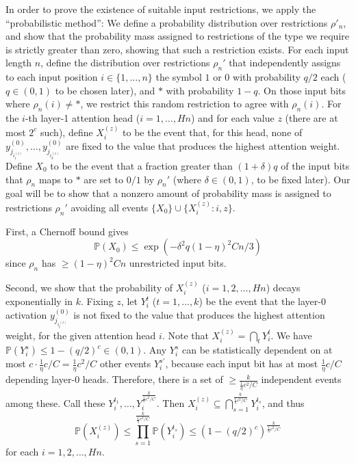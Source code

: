 \documentclass[11pt,a4paper]{article}
\newcommand{\Prob}{\mathbb{P}}%
\begin{document}
In order to prove the existence of suitable input restrictions, we apply the ``probabilistic method'': We define a probability distribution over restrictions $\rho'_n$, and show that the probability mass assigned to restrictions of the type we require is strictly greater than zero, showing that such a restriction exists.
For each input length $n$, define the distribution over restrictions $\rho_n'$ that independently assigns to each input position $i \in \{1, \dots, n\}$ the symbol $1$ or $0$ with probability $q/2$ each ($q \in (0,1)$ to be chosen later), and $*$ with probability $1-q$.
On those input bits where $\rho_n(i) \neq *$, we restrict this random restriction to agree with $\rho_n(i)$.
For the $i$-th layer-1 attention head ($i=1,\dots,Hn$) and for each value $z$ (there are at most $2^c$ such), define $X_i^{(z)}$ to be the event that, for this head, none of $y_{j_{i_1^{(z)}}}^{(0)}, \dots, y_{j_{i_k^{(z)}}}^{(0)}$ are fixed to the value that produces the highest attention weight. %
Define $X_0$ to be the event that a fraction greater than $(1+\delta)q$ of the input bits that $\rho_n$ maps to $*$ are set to $0/1$ by $\rho_n'$ (where $\delta \in (0,1)$, to be fixed later).
Our goal will be to show that a nonzero amount of probability mass is assigned to restrictions $\rho_n'$ avoiding all events $\{X_0\} \cup \{X_i^{(z)} : i, z\}$.

First, a Chernoff bound gives~\cite[Theorem 4.4]{mitzenmacherprobability}
\begin{equation}
\Prob(X_0) \leq    \exp\left(-\delta^2q(1-\eta)^2Cn / 3\right)
\end{equation}
since $\rho_n$ has $\geq (1-\eta)^2Cn$ unrestricted input bits.

Second, we show that the probability of $X_i^{(z)}$ ($i=1,2,\dots, Hn$) decays exponentially in $k$.
Fixing $z$, let $Y_i^t$ ($t=1,\dots,k$) be the event that the layer-0 activation $y_{j_{i_t^{(z)}}}^{(0)}$ is not fixed to the value that produces the highest attention weight, for the given attention head $i$.
Note that $X_i^{(z)} = \bigcap_t Y_i^t$.
We have $\Prob(Y_i^s) \leq 1-(q/2)^c \in (0,1)$. 
Any $Y_i^s$ can be statistically dependent on at most $c \cdot \frac{1}{\eta}c/C = \frac{1}{\eta}c^2/C$ other events $Y_i^{s'}$, because each input bit has at most $\frac{1}{\eta} c/C$ depending layer-0 heads.
Therefore, there is a set of $\geq \frac{k}{\frac{1}{\eta}c^2/C}$ independent events among these.
Call these $Y_i^{t_1}, \dots, Y_i^{\frac{k}{\frac{1}{\eta}c^2/C}}$.
Then $X_i^{(z)} \subseteq \bigcap_{s=1}^{\frac{k}{\frac{1}{\eta}c^2/C}} Y_i^{t_s}$, and thus
\begin{equation}
\Prob(X_i^{(z)}) \leq \prod_{s=1}^{\frac{k}{\frac{1}{\eta}c^2/C}} \Prob(Y_i^{t_s}) \leq \left(1-(q/2)^c\right)^{\frac{k}{\frac{1}{\eta}c^2/C}}
\end{equation}
for each $i=1, 2, \dots, Hn$.
\end{document}
